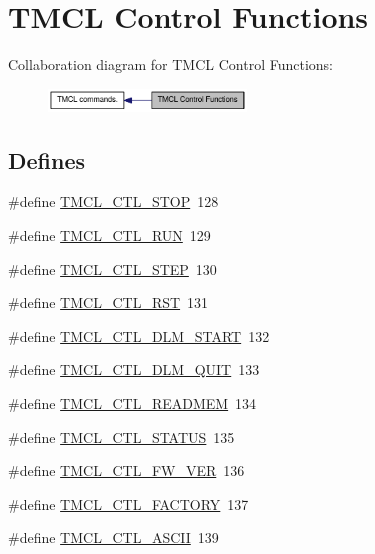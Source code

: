 \hypertarget{group__CTLFuncs}{
\section{TMCL Control Functions}
\label{group__CTLFuncs}
}


Collaboration diagram for TMCL Control Functions:\nopagebreak
\begin{figure}[H]
\begin{center}
\leavevmode
\includegraphics[width=149pt]{group__CTLFuncs}
\end{center}
\end{figure}
\subsection*{Defines}
\begin{DoxyCompactItemize}
\item 
\#define \hyperlink{group__CTLFuncs_gaa9e1148b7664ea0b5a78f845332b4fd7}{TMCL\_\-CTL\_\-STOP}~128
\item 
\#define \hyperlink{group__CTLFuncs_ga22166cf0f91912ea37048297d8030247}{TMCL\_\-CTL\_\-RUN}~129
\item 
\#define \hyperlink{group__CTLFuncs_ga0ffb8262b5b83a477e839844789fe986}{TMCL\_\-CTL\_\-STEP}~130
\item 
\#define \hyperlink{group__CTLFuncs_ga433f27b92ba499465f7eab488fbd3cea}{TMCL\_\-CTL\_\-RST}~131
\item 
\#define \hyperlink{group__CTLFuncs_gab0ffec97bdd896d0d98eacf2c80ac946}{TMCL\_\-CTL\_\-DLM\_\-START}~132
\item 
\#define \hyperlink{group__CTLFuncs_gaff3c81037366905174f34c8406f058c7}{TMCL\_\-CTL\_\-DLM\_\-QUIT}~133
\item 
\#define \hyperlink{group__CTLFuncs_ga9d883e9bae5236c285877f884bb8a613}{TMCL\_\-CTL\_\-READMEM}~134
\item 
\#define \hyperlink{group__CTLFuncs_gaf8364761b483fed9c95abaedffcf0ec2}{TMCL\_\-CTL\_\-STATUS}~135
\item 
\#define \hyperlink{group__CTLFuncs_gaac0228cc9a707b904b510de74a7fb505}{TMCL\_\-CTL\_\-FW\_\-VER}~136
\item 
\#define \hyperlink{group__CTLFuncs_gab41e9c01de441b30b228801e51243895}{TMCL\_\-CTL\_\-FACTORY}~137
\item 
\#define \hyperlink{group__CTLFuncs_ga36f62eadca8ba64c832ac6120f5a372a}{TMCL\_\-CTL\_\-ASCII}~139
\end{DoxyCompactItemize}


